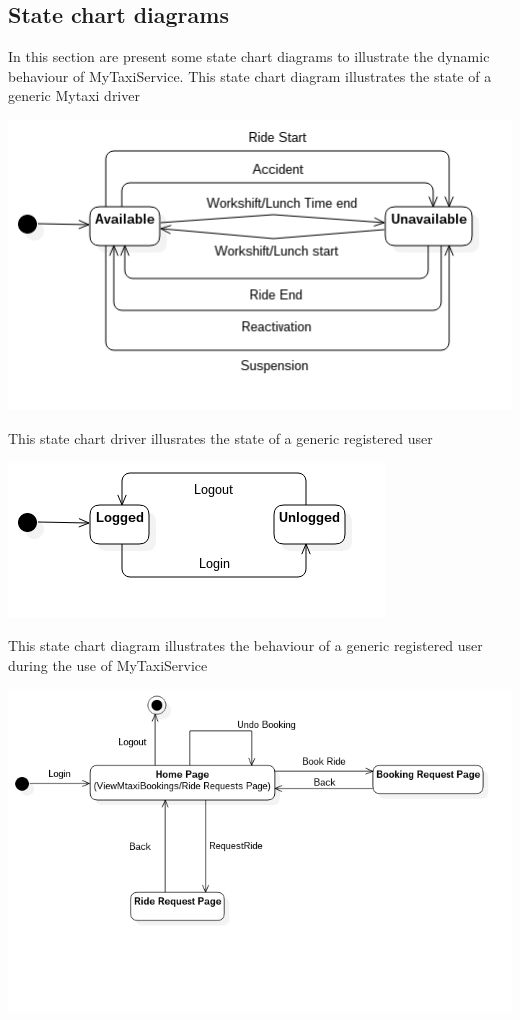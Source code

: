 \documentclass[11pt,titlepage]{article} %
\begin{document}
	\subsection{State chart diagrams}
	In this section are present some state chart diagrams to illustrate the dynamic behaviour of MyTaxiService.\newline
	\newline
	This state chart diagram illustrates the state of a generic Mytaxi driver
	\begin{center}
	\includegraphics[scale=0.52]{statechartdriver.png}
	\end{center}
	This state chart driver illusrates the state of a generic registered user\newline
	\newline
	\begin{center}
	\includegraphics[scale=0.52]{statechartuser.png}
	\end{center}
	\newpage
	This state chart diagram illustrates the behaviour of a generic registered user during the use of MyTaxiService\newline
	\newline
	\begin{center}
	\includegraphics[scale=0.52]{statechartgeneral.png}
	\end{center}
	\newpage
\end{document}
